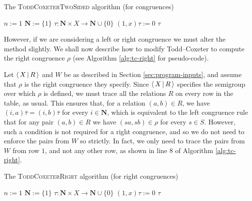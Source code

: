 \begin{algorithm}
\caption{The \textsc{ToddCoxeterTwoSided} algorithm (for congruences)}
\label{alg:tc-twosided}
\begin{algorithmic}[1]
\State $n := 1$
\State $\mathbf{N} := \{1\}$
\State $\tau : \mathbf{N} \times X \to \mathbf{N} \cup \{0\}$
  \State $(1, x)\tau := 0$
\EndFor
{}
    \State {}
  \EndFor
    \State {}
  \EndFor
\EndFor
\State \Return $\tau$
\EndProcedure
\end{algorithmic}
\end{algorithm}

However, if we are considering a left or right congruence we
must alter the method slightly.  We shall now describe how to modify
Todd--Coxeter to compute the right congruence $\rho$ (see Algorithm
\ref{alg:tc-right} for pseudo-code).

Let $\left\langle\,X\,\middle|\,R\,\right\rangle$ and $W$ be as described in Section \ref{sec:program-inputs}, and
assume that $\rho$ is the right congruence they specify.  Since
$\left\langle\,X\,\middle|\,R\,\right\rangle$ specifies the semigroup over which $\rho$ is defined, we must trace
all the relations $R$ on every row in the table, as usual.  This ensures that,
for a relation $(a,b) \in R$, we have $(i, a)\bar\tau = (i, b)\bar\tau$ for
every $i \in \mathbf{N}$, which is equivalent to the left congruence rule that
for any pair $(a,b) \in R$ we have $(sa, sb) \in \rho$ for every $s \in S$.
However, such a condition is not required for a right congruence, and so we do
not need to enforce the pairs from $W$ so strictly.  In fact, we only need to
trace the pairs from $W$ from row $1$, and not any other row, as shown in line 8
of Algorithm \ref{alg:tc-right}.

\begin{algorithm}
\caption{The \textsc{ToddCoxeterRight} algorithm (for right congruences)}
\label{alg:tc-right}
\begin{algorithmic}[1]
\State $n := 1$
\State $\mathbf{N} := \{1\}$
\State $\tau : \mathbf{N} \times X \to \mathbf{N} \cup \{0\}$
  \State $(1, x)\tau := 0$
\EndFor
{}
  \State {}
\EndFor
{}
    \State {}
  \EndFor
\EndFor
\State \Return $\tau$
\EndProcedure
\end{algorithmic}
\end{algorithm}

